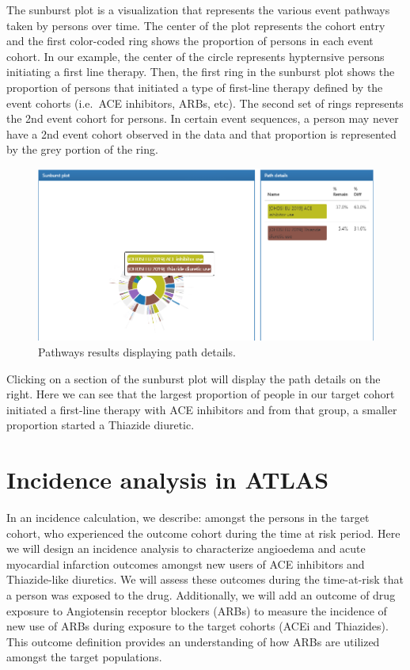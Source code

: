 \documentclass[11pt]{book}
\theoremstyle{definition}
\theoremstyle{definition}
\theoremstyle{definition}
\theoremstyle{remark}
\begin{document}
The sunburst plot is a visualization that represents the various event pathways taken by persons over time. The center of the plot represents the cohort entry and the first color-coded ring shows the proportion of persons in each event cohort. In our example, the center of the circle represents hypternsive persons initiating a first line therapy. Then, the first ring in the sunburst plot shows the proportion of persons that initiated a type of first-line therapy defined by the event cohorts (i.e.~ACE inhibitors, ARBs, etc). The second set of rings represents the 2nd event cohort for persons. In certain event sequences, a person may never have a 2nd event cohort observed in the data and that proportion is represented by the grey portion of the ring.

\begin{figure}

{\centering \includegraphics[width=1\linewidth]{images/Characterization/atlasPathwaysResultsPathDetails} 

}

\caption{Pathways results displaying path details.}\label{fig:atlasPathwaysResultsPathDetails}
\end{figure}

Clicking on a section of the sunburst plot will display the path details on the right. Here we can see that the largest proportion of people in our target cohort initiated a first-line therapy with ACE inhibitors and from that group, a smaller proportion started a Thiazide diuretic.

\hypertarget{incidence-analysis-in-atlas}{%
\section{Incidence analysis in ATLAS}\label{incidence-analysis-in-atlas}}

In an incidence calculation, we describe: amongst the persons in the target cohort, who experienced the outcome cohort during the time at risk period. Here we will design an incidence analysis to characterize angioedema and acute myocardial infarction outcomes amongst new users of ACE inhibitors and Thiazide-like diuretics. We will assess these outcomes during the time-at-risk that a person was exposed to the drug. Additionally, we will add an outcome of drug exposure to Angiotensin receptor blockers (ARBs) to measure the incidence of new use of ARBs during exposure to the target cohorts (ACEi and Thiazides). This outcome definition provides an understanding of how ARBs are utilized amongst the target populations.
\end{document}
